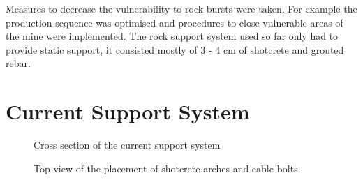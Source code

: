 Measures to decrease the vulnerability to rock bursts were taken. For example the production sequence was optimised and procedures to close vulnerable areas of the mine were implemented.
The rock support system used so far only had to provide static support, it consisted mostly of 3 - 4 cm of shotcrete and grouted rebar. \autocite[9]{dahner12}

\section{Current Support System}

\begin{figure}
    \centering
    
    \caption{Cross section of the current support system}
    \label{fig:cross}
\end{figure}

\begin{figure}
    \centering
    
    \caption{Top view of the placement of shotcrete arches and cable bolts}
    \label{fig:arch}
\end{figure}

